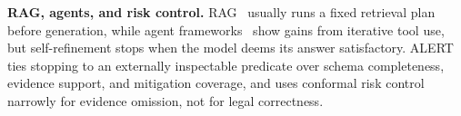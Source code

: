 \textbf{RAG, agents, and risk control.} RAG~\citep{lewis2020retrieval,karpukhin2020dense,gao2023retrieval} usually runs a fixed retrieval plan before generation, while agent frameworks~\citep{yao2022react,shinn2023reflexion,wei2022chain,langgraph2024,autogpt2023,park2023generative,wang2024voyager,wang2024multiagent} show gains from iterative tool use, but self-refinement stops when the model deems its answer satisfactory. ALERT ties stopping to an externally inspectable predicate over schema completeness, evidence support, and mitigation coverage, and uses conformal risk control~\citep{angelopoulos2023conformalrisk,angelopoulos2021ltt,geifman2017selective} narrowly for evidence omission, not for legal correctness.
